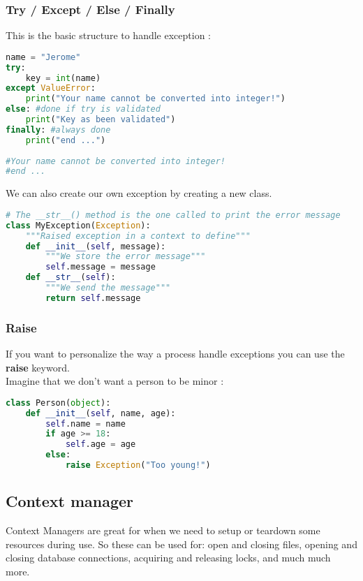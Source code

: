 \documentclass[a4paper, 12pt, titlepage]{scrartcl} %
\begin{document}
\subsubsection{Try / Except / Else / Finally}
This is the basic structure to handle exception :
\label{TEEF}
\begin{lstlisting}[language=Python]
name = "Jerome"
try:
	key = int(name)
except ValueError:
	print("Your name cannot be converted into integer!")
else: #done if try is validated
	print("Key as been validated")
finally: #always done
	print("end ...")
	
#Your name cannot be converted into integer!
#end ...
\end{lstlisting} \vspace{5mm}

We can also create our own exception by creating a new class.
\begin{lstlisting}[language=Python]
# The __str__() method is the one called to print the error message
class MyException(Exception):
    """Raised exception in a context to define"""
    def __init__(self, message):
        """We store the error message"""
        self.message = message
    def __str__(self):
        """We send the message"""
        return self.message
\end{lstlisting} \vspace{5mm}

\subsubsection{Raise}
\label{Raise}
If you want to personalize the way a process handle exceptions you can use the \textbf{raise} keyword. \\
Imagine that we don't want a person to be minor :
\begin{lstlisting}[language=Python]
class Person(object):
    def __init__(self, name, age):
        self.name = name
        if age >= 18:
            self.age = age
        else:
            raise Exception("Too young!")
\end{lstlisting} \vspace{5mm}

\subsection{Context manager}
\label{subsec:ContextManager}
Context Managers are great for when we need to setup or teardown some resources during use. So these can be used for: open and closing files, opening and closing database connections, acquiring and releasing locks, and much much more.
\end{document}
